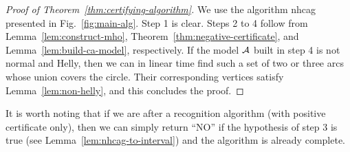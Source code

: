 \documentclass[10pt]{article}
\begin{document}
\begin{proof}[Proof of Theorem~\ref{thm:certifying-algorithm}]
  We use the algorithm {nhcag} presented in
  Fig.~\ref{fig:main-alg}.  Step 1 is clear.  Steps 2 to 4 follow from
  Lemma~\ref{lem:construct-mho}, Theorem~\ref{thm:negative-certificate},
  and Lemma~\ref{lem:build-ca-model}, respectively.  If the model $\cal
  A$ built in step 4 is not normal and Helly, then we can in linear
  time find such a set of two or three arcs whose union covers the
  circle.  Their corresponding vertices satisfy
  Lemma~\ref{lem:non-helly}, and this concludes the proof.
\end{proof}
It is worth noting that if we are after a recognition algorithm (with
positive certificate only), then we can simply return ``NO'' if the
hypothesis of step 3 is true (see Lemma~\ref{lem:nhcag-to-interval})
and the algorithm is already complete.
\end{document}
